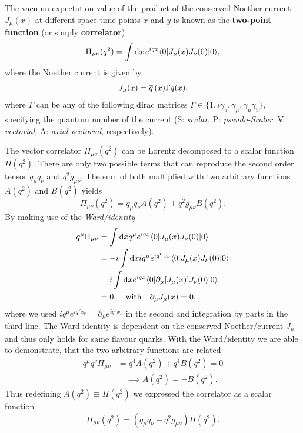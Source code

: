 \documentclass[../../index.tex]{subfiles}
\begin{document}
The vacuum expectation value of the product of the conserved Noether current
$J_\mu(x)$ at different space-time points $x$ and $y$ is known as the
\textbf{two-point function} (or simply \textbf{correlator})
\begin{equation}
  \label{eq:twoPointFunction}
  \Pi_{\mu\nu}(q^2) = \int \dif x \, e^{iqx} \langle  0 | J_\mu(x) J_\nu(0) | 0 \rangle,
\end{equation}
where the Noether current is given by
\begin{equation}
  \label{eq:qcdCurrent}
  J_\mu(x) = \overline{q}\,(x) \Gamma q(x),
\end{equation}
where $\Gamma$ can be any of the following dirac matrices $\Gamma \in \{ 1,
i\gamma_5, \gamma_\mu, \gamma_\mu\gamma_5\}$, specifying the quantum number of
the current (S: \textit{scalar}, P: \textit{pseudo-Scalar}, V:
\textit{vectorial}, A: \textit{axial-vectorial}, respectively).

The vector correlator $\Pi_{\mu\nu}(q^2)$ can be Lorentz decomposed to a scalar
function $\Pi(q^2)$. There are only two possible terms that can reproduce the
second order tensor $q_\mu q_\nu$ and $q^2 g_{\mu\nu}$. The sum of both
multiplied with two arbitrary functions $A(q^2)$ and $B(q^2)$ yields
\begin{equation}
  \Pi_{\mu\nu}(q^2) = q_\mu q_\nu A(q^2) + q^2 g_{\mu\nu} B(q^2).
\end{equation}
By making use of the \textit{Ward\-/identity}
\begin{equation}
  \label{eq:wardIdentity}
  \begin{split}
    q^\mu \Pi_{\mu\nu} &= \int \dif x q^\mu e^{iqx} \langle 0 \vert  J_\mu(x) J_\nu(0) \vert 0 \rangle \\
    &= -i \int \dif x i q^\mu e^{i q^\nu x_\nu} \langle 0 \vert J_\mu(x) J_\nu(0) \vert 0 \rangle \\
    &= i \int \dif x e^{iqx} \langle 0 \vert \partial_\mu[J_\mu(x)] J_\nu(0)
    \vert 0 \rangle \\
    &= 0, \quad \text{with} \quad \partial_\mu J_\mu(x) = 0,
  \end{split}
\end{equation}
where we used $i q^\mu e^{i q^\nu x_\nu} = \partial_\mu e^{i q^\nu x_\nu}$ in
the second and integration by parts in the third line. The Ward identity is
dependent on the conserved Noether\-/current $J_\mu$ and thus only holds for
same flavour quarks. With the Ward\-/identity we are able to demonstrate, that
the two arbitrary functions are related
\begin{equation}
  \begin{split}
    q^\mu q^\nu \Pi_{\mu\nu} &= q^4 A(q^2) + q^4 B(q^2) = 0 \\
    &\quad \implies A(q^2) = -B(q^2).
  \end{split}
\end{equation}
Thus redefining $A(q^2) \equiv \Pi(q^2)$ we expressed the correlator as a scalar
function
\begin{equation}
  \Pi_{\mu\nu}(q^2) = (q_\mu q_\nu - q^2 g_{\mu\nu})\Pi(q^2).
\end{equation}
\end{document}

